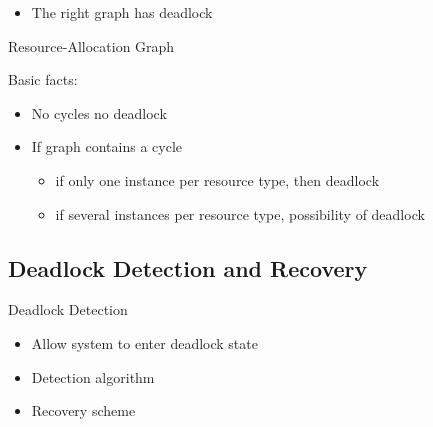 \begin{itemize}
\item The right graph has deadlock
\end{itemize}

\begin{frame}{Resource-Allocation Graph}
  \begin{minipage}{.29\linewidth}
    \begin{center}
       
    \end{center}
  \end{minipage}\hfill
  \begin{minipage}{.69\linewidth}
    \begin{block}{Basic facts:}
      \begin{itemize}
      \item No cycles  no deadlock
      \item If graph contains a cycle 
        \begin{itemize}
        \item if only one instance per resource type, then deadlock
        \item if several instances per resource type, possibility of deadlock
        \end{itemize}
      \end{itemize}
    \end{block}
  \end{minipage}
\end{frame}

\subsection{Deadlock Detection and Recovery}
\label{sec:deadl-detect-recov}

\begin{frame}{Deadlock Detection}
  \begin{itemize}
  \item Allow system to enter deadlock state
  \item Detection algorithm
  \item Recovery scheme
  \end{itemize}
\end{frame}

